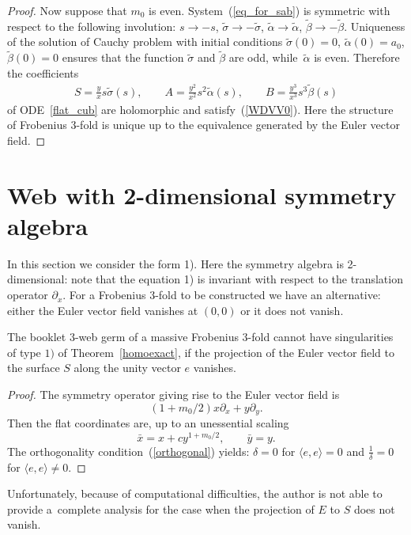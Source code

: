 \documentclass[pdftex]{sigma}
\begin{document}
\begin{proof}
Now suppose that $m_0$ is even. System~(\ref{eq_for_sab})
is symmetric with respect to the following involution:
$s\to -s$, $\tilde{\sigma}\to -\tilde{\sigma}$, $\tilde{\alpha}\to \tilde{\alpha}$,
$\tilde{\beta}\to -\tilde{\beta}$.
Uniqueness of the solution of Cauchy problem with initial conditions
$\tilde{\sigma}(0)=0$, $\tilde{\alpha}(0)=a_0$, $\tilde{\beta}(0)=0$
ensures that the function $\tilde{\sigma}$ and $\tilde{\beta}$ are odd, while~$\tilde{\alpha}$ is even.
Therefore the coef\/f\/icients
\begin{gather*}
S=\frac{y}{x}s\tilde{\sigma}(s), \qquad A=\frac{y^2}{x^2}s^2\tilde{\alpha}(s), \qquad B=\frac{y^3}{x^3}s^3\tilde{\beta}(s)
\end{gather*}
of ODE~\eqref{flat_cub} are holomorphic and satisfy~(\ref{WDVV0}). Here the structure of Frobenius $3$-fold is unique up to the equivalence generated by the Euler vector f\/ield.
\end{proof}


\section{Web with 2-dimensional symmetry algebra}
In this section we consider the form 1).
Here the symmetry algebra is 2-dimensional:
note that the equation 1) is invariant with respect to the translation operator $\partial_x$.
For a Frobenius $3$-fold to be constructed we have an alternative:
either the Euler vector f\/ield vanishes at $(0,0)$ or it does not vanish.


\begin{proposition}
The booklet $3$-web germ of a massive Frobenius $3$-fold cannot have singularities of type $1)$
of Theorem~{\rm\ref{homoexact}},
if the projection of the Euler vector field to the surface $S$ along the unity vector $e$ vanishes.
\end{proposition}
\begin{proof}
The symmetry operator giving rise to the Euler vector f\/ield is
\[
(1+{m_0}/{2})x\partial_x+y\partial_y.
\]
Then the f\/lat coordinates are, up to an unessential scaling
\[
\bar{x}=x+cy^{1+{m_0}/{2}}, \qquad \bar{y}=y.
\]
The orthogonality condition~(\ref{orthogonal}) yields: $\delta=0$ for $\langle e,e\rangle=0$
and $\frac{1}{\delta}=0$ for $\langle e,e\rangle \ne 0$.
\end{proof}

Unfortunately, because of %
computational dif\/f\/iculties,
the author is not able to provide a~complete analysis for the case when the projection of $E$ to $S$ does not vanish.
\end{document}
